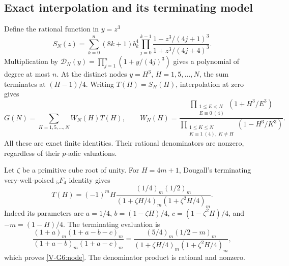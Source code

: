 \documentclass[11pt,letterpaper]{article}
\numberwithin{equation}{section}
\begin{document}
\subsection{Exact interpolation and its terminating model}
Define the rational function in $y=z^3$
\[
 S_N(z)=\sum_{k=0}^{n}(8k+1)b_k^4
 \prod_{j=0}^{k-1}\frac{1-z^3/(4j+1)^3}{1+z^3/(4j+4)^3}.
\]
Multiplication by $\mathcal D_N(y)=\prod_{j=1}^{n}(1+y/(4j)^3)$
gives a polynomial of degree at most $n$. At the distinct nodes
$y=H^3$, $H=1,5,\ldots,N$, the sum terminates at $(H-1)/4$.
Writing $T(H)=S_H(H)$, interpolation at zero gives
\begin{equation}\label{V-G6:interpolation}
 G(N)=\sum_{H=1,5,\ldots,N}W_N(H)T(H),\qquad
 W_N(H)=
 \frac{\prod_{\substack{1\le E<N\\E\equiv0\ (4)}}(1+H^3/E^3)}
 {\prod_{\substack{1\le K\le N\\K\equiv1\ (4),\ K\ne H}}
        (1-H^3/K^3)}.
\end{equation}
All these are exact finite identities. Their rational denominators
are nonzero, regardless of their $p$-adic valuations.

Let $\zeta$ be a primitive cube root of unity. For $H=4m+1$,
Dougall's terminating very-well-poised ${}_5F_4$ identity gives
\begin{equation}\label{V-G6:node}
 T(H)=(-1)^mH\frac{(1/4)_m(1/2)_m}
 {(1+\zeta H/4)_m(1+\zeta^2H/4)_m}.
\end{equation}
Indeed its parameters are $a=1/4$, $b=(1-\zeta H)/4$,
$c=(1-\zeta^2H)/4$, and $-m=(1-H)/4$. The terminating evaluation is
\[
 \frac{(1+a)_m(1+a-b-c)_m}
 {(1+a-b)_m(1+a-c)_m}
 =\frac{(5/4)_m(1/2-m)_m}
 {(1+\zeta H/4)_m(1+\zeta^2H/4)_m},
\]
which proves \eqref{V-G6:node}. The denominator product is rational
and nonzero.
\end{document}
